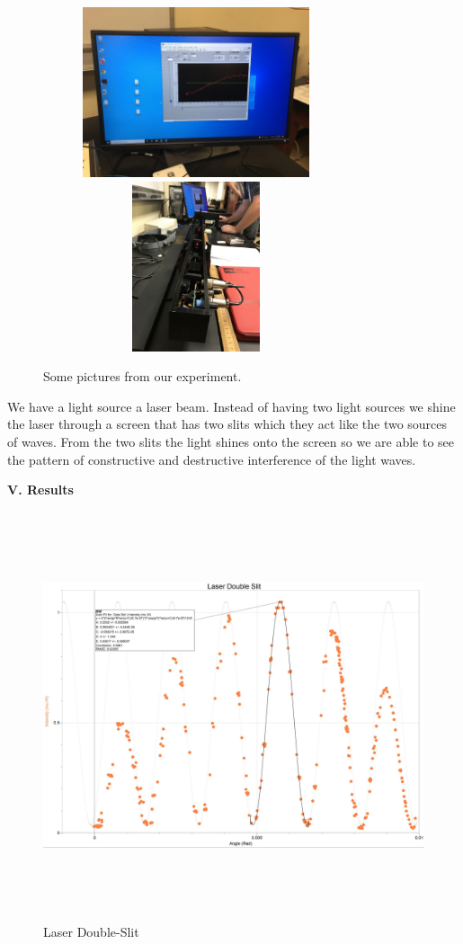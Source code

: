 \documentclass[fleqn]{article}
\begin{document}
\begin{figure}[h!]
    \includegraphics[height=5cm, width=9cm]{2 (5).jpg}
    \includegraphics[height=5cm, width=9cm]{2 (6).jpg}
    \caption{
      Some pictures from our experiment.
    }
  \end{figure}

  We have a light source a laser beam. Instead of having two light sources we shine the laser through a
  screen that has two slits which they act like the two sources of waves. From the two slits the light
  shines onto the screen so we are able to see the pattern of constructive and destructive interference 
  of the light waves.
  
  \vspace{20px}


  \textbf{V. Results}

  \vspace{10px}

    
  \begin{figure}[h!]
    \includegraphics[height=12cm, width=18cm]{Fig1.JPG}
    \caption{
      Laser Double-Slit
    }
  \end{figure}
\end{document}
